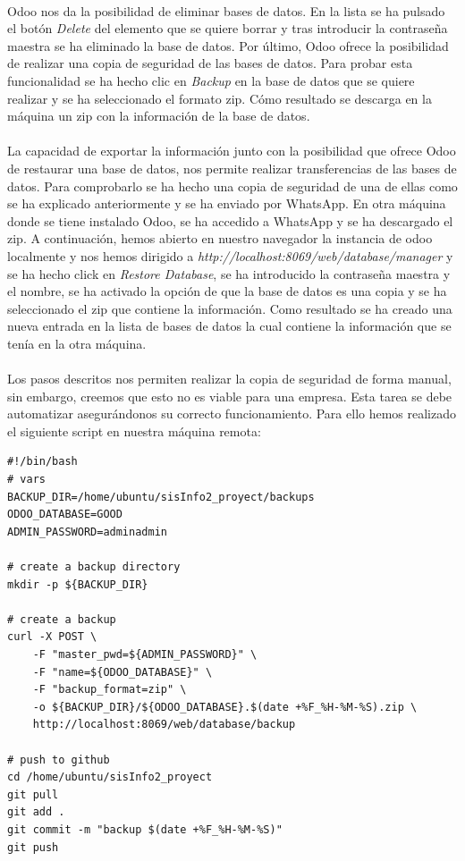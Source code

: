\paragraph{}
Odoo nos da la posibilidad de eliminar bases de datos. En la lista se ha pulsado el botón \textit{Delete} del elemento que se quiere borrar y tras introducir la contraseña maestra se ha eliminado la base de datos. Por último, Odoo ofrece la posibilidad de realizar una copia de seguridad de las bases de datos. Para probar esta funcionalidad se ha hecho clic en \textit{Backup} en la base de datos que se quiere realizar y se ha seleccionado el formato zip. Cómo resultado se descarga en la máquina un zip con la información de la base de datos. 
\paragraph{}
La capacidad de exportar la información junto con la posibilidad que ofrece Odoo de restaurar una base de datos, nos permite realizar transferencias de las bases de datos. Para comprobarlo se ha hecho una copia de seguridad de una de ellas como se ha explicado anteriormente y se ha enviado por WhatsApp. En otra máquina donde se tiene instalado Odoo, se ha accedido a WhatsApp y se ha descargado el zip. A continuación, hemos abierto en nuestro navegador la instancia de odoo localmente y nos hemos dirigido a \textit{http://localhost:8069/web/database/manager} y se ha hecho click en \textit{Restore Database}, se ha introducido la contraseña maestra y el nombre, se ha activado la opción de que la base de datos es una copia y se ha seleccionado el zip que contiene la información. Como resultado se ha creado una nueva entrada en la lista de bases de datos la cual contiene la información que se tenía en la otra máquina.

\paragraph{}
Los pasos descritos nos permiten realizar la copia de seguridad de forma manual, sin embargo, creemos que esto no es viable para una empresa. Esta tarea se debe automatizar asegurándonos su correcto funcionamiento. Para ello hemos realizado el siguiente script en nuestra máquina remota:

\begin{lstlisting}[frame=single, basicstyle=\tiny]
#!/bin/bash
# vars
BACKUP_DIR=/home/ubuntu/sisInfo2_proyect/backups
ODOO_DATABASE=GOOD
ADMIN_PASSWORD=adminadmin

# create a backup directory
mkdir -p ${BACKUP_DIR}

# create a backup
curl -X POST \
    -F "master_pwd=${ADMIN_PASSWORD}" \
    -F "name=${ODOO_DATABASE}" \
    -F "backup_format=zip" \
    -o ${BACKUP_DIR}/${ODOO_DATABASE}.$(date +%F_%H-%M-%S).zip \
    http://localhost:8069/web/database/backup

# push to github
cd /home/ubuntu/sisInfo2_proyect
git pull
git add .
git commit -m "backup $(date +%F_%H-%M-%S)"
git push
\end{lstlisting}

